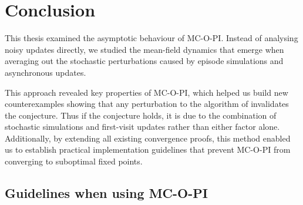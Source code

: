 \chapter{Conclusion}
\label{ch: conclusion}





This thesis examined the asymptotic behaviour of MC-O-PI.
Instead of analysing noisy updates directly, we studied the mean-field dynamics that emerge when averaging out the stochastic perturbations caused by
episode simulations and asynchronous updates.


This approach revealed key properties of MC-O-PI,
which helped us build new counterexamples
showing that any perturbation to the algorithm of \citet[p. 99]{Sutton2018ReinforcementIntroduction} invalidates the conjecture. Thus if the conjecture holds, it is due to the combination of stochastic simulations and first-visit updates rather than either factor alone.
Additionally, by extending all existing convergence proofs,
this method enabled us to establish practical implementation guidelines that prevent MC-O-PI from converging to suboptimal fixed points.




\section{Guidelines when using MC-O-PI}

